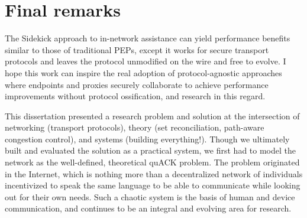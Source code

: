\section{Final remarks}
\label{sec:conclusion:remarks}

The Sidekick approach to in-network assistance can yield performance benefits
similar to those of traditional PEPs, except it works for secure transport
protocols and leaves the protocol unmodified on the wire and free to evolve.
I hope this work can inspire the real adoption of protocol-agnostic approaches
where endpoints and proxies securely collaborate to achieve performance
improvements without protocol ossification, and research in this regard.

This dissertation presented a research problem and solution at the intersection
of networking (transport protocols), theory (set reconciliation, path-aware
congestion control), and systems (building everything!). Though we ultimately
built and evaluated the solution as a practical system, we first had to model
the network as the well-defined, theoretical quACK problem. The problem
originated in the Internet, which is nothing more than a decentralized network
of individuals incentivized to speak the same language to be able to
communicate while looking out for their own needs. Such a chaotic system is the
basis of human and device communication, and continues to be an integral and
evolving area for research.
